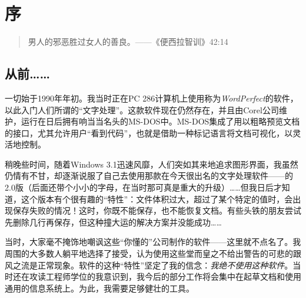 \chapter*{序}

\begin{quote}
    男人的邪恶胜过女人的善良。——《便西拉智训》42:14
\end{quote}

\section*{从前……}

一切始于1990年年初。我当时正在PC 286计算机上使用称为\textit{WordPerfect}的软件，以此入门人们所谓的“文字处理”。这款软件现在仍然存在，并且由Corel公司维护，运行在日后拥有响当当名头的MS-DOS中。MS-DOS集成了用以粗略预览文档的接口，尤其允许用户“看到代码”，也就是借助一种标记语言将文档可视化，以灵活地控制。

稍晚些时间，随着Windows 3.1迅速风靡，人们突如其来地追求图形界面，我虽然仍情有不甘，却逐渐说服了自己去使用那款在今天很出名的文字处理软件——的2.0版（后面还带个小小的字母，在当时那可真是重大的升级）……但我日后才知道，这个版本有个很有趣的“特性”：文件体积过大，超过了某个特定的值时，会出现保存失败的情况！这时，你既不能保存，也不能恢复文档。有些头铁的朋友尝试先删除几行再保存，但这种撞大运的解决方案并没能成功……

当时，大家毫不掩饰地嘲讽这些“你懂的”公司制作的软件——这里就不点名了。我周围的大多数人躺平地选择了接受，认为使用这些堂而皇之不给出警告的可悲的跟风之流是正常现象。软件的这种“特性”坚定了我的信念：\textit{我绝不使用这种软件}。当时还在攻读工程师学位的我意识到，我今后的部分工作将会集中在起草文档和使用通用的信息系统上。为此，我需要足够健壮的工具。

